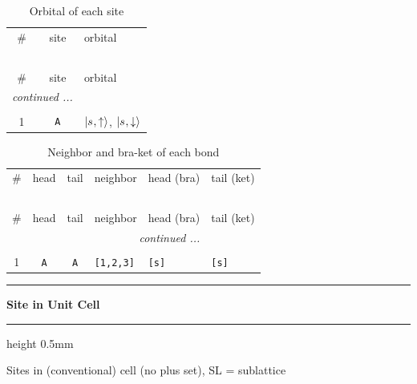 \documentclass[fleqn,10pt,landscape]{jsarticle}
\begin{document}
\renewcommand{\arraystretch}{1.6}
\begin{longtable}[l]{ccl}
\captionsetup{justification=raggedright, singlelinecheck=off}
\caption{Orbital of each site}
 \\
 \hline \hline
\# & site & orbital \\ \hline \endfirsthead

\multicolumn{2}{l}{\tablename\ \thetable{}} \\
 \hline \hline
\# & site & orbital \\ \hline \endhead

 \hline \hline
\multicolumn{2}{r}{\footnotesize\it continued ...} \\ \endfoot

 \hline \hline
\multicolumn{2}{r}{} \\ \endlastfoot

1 & \texttt{A} & $\ket{s_{},\uparrow}$, $\ket{s_{},\downarrow}$ \\
\end{longtable}
\renewcommand{\arraystretch}{1.6}
\begin{longtable}[l]{ccclll}
\captionsetup{justification=raggedright, singlelinecheck=off}
\caption{Neighbor and bra-ket of each bond}
 \\
 \hline \hline
\# & head & tail & neighbor & head (bra) & tail (ket) \\ \hline \endfirsthead

\multicolumn{5}{l}{\tablename\ \thetable{}} \\
 \hline \hline
\# & head & tail & neighbor & head (bra) & tail (ket) \\ \hline \endhead

 \hline \hline
\multicolumn{5}{r}{\footnotesize\it continued ...} \\ \endfoot

 \hline \hline
\multicolumn{5}{r}{} \\ \endlastfoot

1 & \texttt{A} & \texttt{A} & \texttt{[1,2,3]} & \texttt{[s]} & \texttt{[s]} \\
\end{longtable}
\vspace{5mm}
\noindent \rule[0.5mm]{5mm}{0.5mm}\hspace{3mm}\textbf{Site in Unit Cell}\hspace{3mm}\leaders\hrule height 0.5mm\hfill\kern0pt
\vspace{3mm}

\noindent Sites in (conventional) cell (no plus set), SL = sublattice
\end{document}

